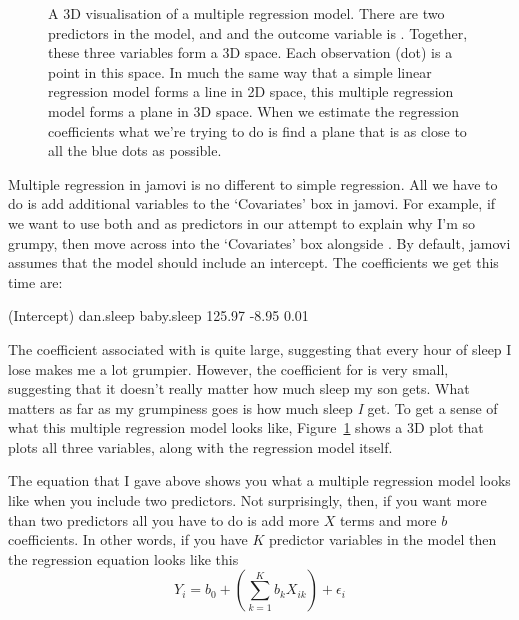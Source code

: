 \begin{figure}[!htb]
\begin{center}
\caption{A 3D visualisation of a multiple regression model. There are two predictors in the model,  and  and the outcome variable is . Together, these three variables form a 3D space. Each observation (dot) is a point in this space. In much the same way that a simple linear regression model forms a line in 2D space, this multiple regression model forms a plane in 3D space. When we estimate the regression coefficients what we're trying to do is find a plane that is as close to all the blue dots as possible.}
\label{fig:multipleregression}
\end{center}
\end{figure}


Multiple regression in jamovi is no different to simple regression. All we have to do is add additional variables to the `Covariates' box in jamovi. For example, if we want to use both  and  as predictors in our attempt to explain why I'm so grumpy, then move  across into the `Covariates' box alongside . By default, jamovi assumes that the model should include an intercept. The coefficients we get this time are:

\begin{rblock1}
(Intercept)    dan.sleep   baby.sleep  
  125.97        -8.95        0.01  
\end{rblock1}

The coefficient associated with  is quite large, suggesting that every hour of sleep I lose makes me a lot grumpier. However, the coefficient for  is very small, suggesting that it doesn't really matter how much sleep my son gets. What matters as far as my grumpiness goes is how much sleep {\it I} get. To get a sense of what this multiple regression model looks like, Figure~\ref{fig:multipleregression} shows a 3D plot that plots all three variables, along with the regression model itself. 


The equation that I gave above shows you what a multiple regression model looks like when you include two predictors. Not surprisingly, then, if you want more than two predictors all you have to do is add more $X$ terms and more $b$ coefficients. In other words, if you have $K$ predictor variables in the model then the regression equation looks like this
$$
Y_i = b_0 + \left( \sum_{k=1}^K b_{k} X_{ik} \right) + \epsilon_i
$$


